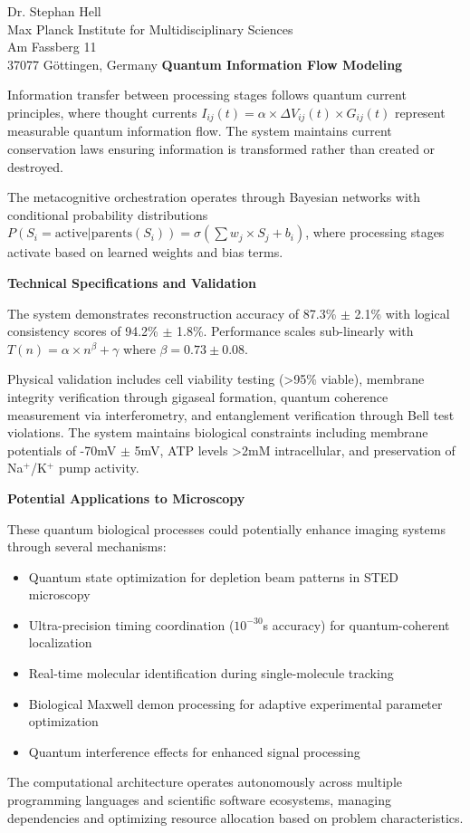 \documentclass[11pt,a4paper]{letter}
\begin{document}
\begin{letter}{Dr. Stephan Hell\\Max Planck Institute for Multidisciplinary Sciences\\Am Fassberg 11\\37077 G\"ottingen, Germany}
\textbf{Quantum Information Flow Modeling}

Information transfer between processing stages follows quantum current principles, where thought currents $I_{ij}(t) = \alpha \times \Delta V_{ij}(t) \times G_{ij}(t)$ represent measurable quantum information flow. The system maintains current conservation laws ensuring information is transformed rather than created or destroyed.

The metacognitive orchestration operates through Bayesian networks with conditional probability distributions $P(S_i = \text{active} | \text{parents}(S_i)) = \sigma(\sum w_j \times S_j + b_i)$, where processing stages activate based on learned weights and bias terms.

\textbf{Technical Specifications and Validation}

The system demonstrates reconstruction accuracy of 87.3\% $\pm$ 2.1\% with logical consistency scores of 94.2\% $\pm$ 1.8\%. Performance scales sub-linearly with $T(n) = \alpha \times n^\beta + \gamma$ where $\beta = 0.73 \pm 0.08$.

Physical validation includes cell viability testing (>95\% viable), membrane integrity verification through gigaseal formation, quantum coherence measurement via interferometry, and entanglement verification through Bell test violations. The system maintains biological constraints including membrane potentials of -70mV $\pm$ 5mV, ATP levels >2mM intracellular, and preservation of Na$^+$/K$^+$ pump activity.

\textbf{Potential Applications to Microscopy}

These quantum biological processes could potentially enhance imaging systems through several mechanisms:

\begin{itemize}
\item Quantum state optimization for depletion beam patterns in STED microscopy
\item Ultra-precision timing coordination ($10^{-30}$s accuracy) for quantum-coherent localization
\item Real-time molecular identification during single-molecule tracking
\item Biological Maxwell demon processing for adaptive experimental parameter optimization
\item Quantum interference effects for enhanced signal processing
\end{itemize}

The computational architecture operates autonomously across multiple programming languages and scientific software ecosystems, managing dependencies and optimizing resource allocation based on problem characteristics.


\end{letter}
\end{document}
